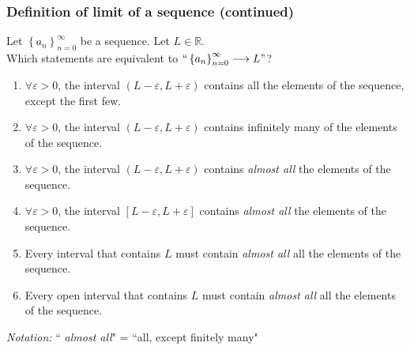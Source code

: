 \documentclass[14pt]{beamer}
\begin{document}
\begin{frame}[t]
	\fontsize{12}{12}\selectfont
	\frametitle{Definition of limit of a sequence (continued)}

	Let $\displaystyle \left\{ a_{n} \right\}_{n=0}^{\infty}$ be a sequence. Let
	$\displaystyle L \in \mathbb{R}$. \\ Which statements are equivalent to $\displaystyle
	``\left\{ a_{n} \right\}_{n=0}^{\infty}\longrightarrow L"$?

	\begin{enumerate}
		\addtocounter{enumi}{9}

		\item $\displaystyle \forall \varepsilon >0$, the interval
			$\displaystyle (L-\varepsilon, L+\varepsilon)$ contains all the elements
			of the sequence, except the first few.

		\item $\displaystyle \forall \varepsilon >0$, the interval
			$\displaystyle (L-\varepsilon, L+\varepsilon)$ contains infinitely many of
			the elements of the sequence.

		\item $\displaystyle \forall \varepsilon >0$, the interval
			$\displaystyle (L-\varepsilon, L+\varepsilon)$ contains \emph{{\color{red} almost all}}
			the elements of the sequence.

		\item $\displaystyle \forall \varepsilon >0$, the interval
			$\displaystyle [L-\varepsilon, L+\varepsilon]$ contains \emph{{\color{red} almost all}}
			the elements of the sequence.

		\item Every interval that contains $L$ must contain \emph{{\color{red} almost all}}
			all the elements of the sequence.

		\item Every open interval that contains $L$ must contain \emph{{\color{red} almost all}}
			all the elements of the sequence.
	\end{enumerate}

	\emph{Notation:} ``\emph{{\color{red} almost all}}" = ``all, except finitely
	many"
\end{frame}
\end{document}
